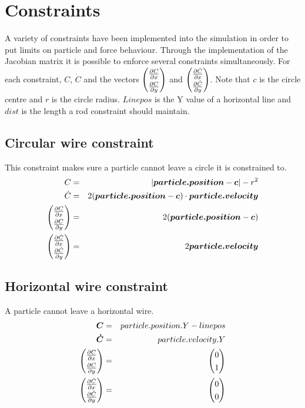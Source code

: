 \chapter{Constraints}
\newcommand{\QD}
{
    \begingroup
    \renewcommand*{\arraystretch}{1.3}
    \begin{pmatrix} \frac{\partial C}{\partial x} \\ \frac{\partial C}{\partial y}  \end{pmatrix}
    \endgroup
}
\newcommand{\QDTD}
{
    \begingroup
    \renewcommand*{\arraystretch}{1.3}
    \begin{pmatrix} \frac{\partial\dot{C}}{\partial x} \\ \frac{\partial \dot{C}}{\partial y}  \end{pmatrix}
    \endgroup
}

A variety of constraints have been implemented into the simulation in order to put limits on particle and force behaviour. Through the implementation of the Jacobian matrix it is possible to enforce several constraints simultaneously. For each constraint, $C$, $\dot{C}$ and the vectors $\QD$ and $\QDTD$. Note that $c$ is the circle centre and $r$ is the circle radius. $Linepos$ is the Y value of a horizontal line and $dist$ is the length a rod constraint should maintain.

\section{Circular wire constraint}
This constraint makes sure a particle cannot leave a circle it is constrained to.
\begin{eqnarray*}
C &=& |\boldsymbol{particle.position} - \boldsymbol{c}| - r^2 \\
\dot{C} &=& 2(\boldsymbol{particle.position} - \boldsymbol{c}) \cdot \boldsymbol{particle.velocity} \\
\QD &=& 2(\boldsymbol{particle.position} - \boldsymbol{c}) \\
\QDTD &=& 2\boldsymbol{particle.velocity}
\end{eqnarray*}

\section{Horizontal wire constraint}
A particle cannot leave a horizontal wire.
\begin{eqnarray*}
\boldsymbol{C} &=& particle.position.Y - linepos \\
\boldsymbol{\dot{C}} &=& particle.velocity.Y \\
\QD &=& \begin{pmatrix} 0 \\ 1  \end{pmatrix} \\
\QDTD &=& \begin{pmatrix} 0 \\ 0  \end{pmatrix}
\end{eqnarray*}

